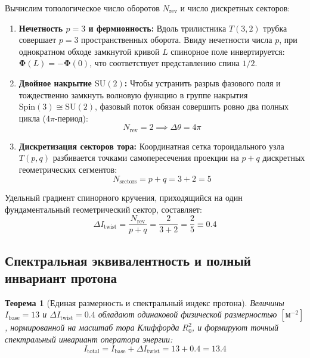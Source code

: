\documentclass[12pt,a4paper]{article}
\newtheorem{theorem}{Теорема}
\begin{document}
Вычислим топологическое число оборотов $N_{\text{rev}}$ и число дискретных секторов:
\begin{enumerate}
	\item \textbf{Нечетность $p=3$ и фермионность:} Вдоль трилистника $T(3,2)$ трубка совершает $p=3$ пространственных оборота. Ввиду нечетности числа $p$, при однократном обходе замкнутой кривой $L$ спинорное поле инвертируется: $\boldsymbol{\Phi}(L) = -\boldsymbol{\Phi}(0)$, что соответствует представлению спина $1/2$.
	\item \textbf{Двойное накрытие $\mathrm{SU}(2)$:} Чтобы устранить разрыв фазового поля и тождественно замкнуть волновую функцию в группе накрытия $\mathrm{Spin}(3) \cong \mathrm{SU}(2)$, фазовый поток обязан совершить ровно два полных цикла ($4\pi$-период):
	\begin{equation}
		N_{\text{rev}} = 2 \implies \Delta \theta = 4\pi
	\end{equation}
	\item \textbf{Дискретизация секторов тора:} Координатная сетка тороидального узла $T(p,q)$ разбивается точками самопересечения проекции на $p+q$ дискретных геометрических сегментов:
	\begin{equation}
		N_{\text{sectors}} = p + q = 3 + 2 = 5
	\end{equation}
\end{enumerate}

Удельный градиент спинорного кручения, приходящийся на один фундаментальный геометрический сектор, составляет:
\begin{equation}
	\Delta I_{\text{twist}} = \frac{N_{\text{rev}}}{p + q} = \frac{2}{3 + 2} = \frac{2}{5} \equiv \mathbf{0.4}
\end{equation}

\subsection{Спектральная эквивалентность и полный инвариант протона}
\begin{theorem}[Единая размерность и спектральный индекс протона]
	Величины $I_{\mathrm{base}} = 13$ и $\Delta I_{\mathrm{twist}} = 0.4$ обладают одинаковой физической размерностью $[\mathrm{м}^{-2}]$, нормированной на масштаб тора Клиффорда $R_0^2$, и формируют точный спектральный инвариант оператора энергии:
	\begin{equation}
		I_{\mathrm{total}} = I_{\mathrm{base}} + \Delta I_{\mathrm{twist}} = 13 + 0.4 = \mathbf{13.4}
	\end{equation}
\end{theorem}
\end{document}
